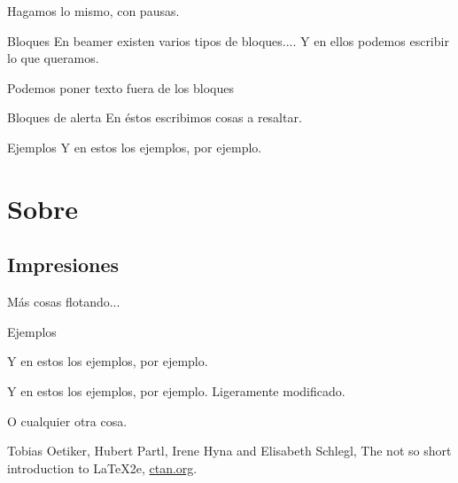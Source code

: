 \documentclass{beamer}
\begin{document}
\begin{frame}

Hagamos lo mismo, con pausas.

\begin{block}{Bloques}
En beamer existen varios tipos de bloques....
Y en ellos podemos escribir lo que queramos.
\end{block}

\pause 
Podemos poner texto fuera de los bloques

\pause
\begin{alertblock}{Bloques de alerta}
En éstos escribimos cosas a resaltar.
\end{alertblock}

\pause
\begin{exampleblock}{Ejemplos}
Y en estos los ejemplos, por ejemplo.
\end{exampleblock}

\end{frame}

\section{Sobre}

\subsection{Impresiones}

\begin{frame}

Más cosas flotando...

\begin{exampleblock}{Ejemplos}
\begin{overprint}


Y en estos los ejemplos, por ejemplo.


Y en estos los ejemplos, por ejemplo. Ligeramente modificado.


O cualquier otra cosa.

\end{overprint}
\end{exampleblock}

\end{frame}


\begin{thebibliography}{10}
 Tobias Oetiker, Hubert Partl, Irene Hyna and Elisabeth Schlegl, The not so short introduction to \LaTeX2e, \href{http://www.ctan.org/tex-archive/info/lshort/english/lshort.pdf}{ctan.org}.
\end{thebibliography}
\end{document}

